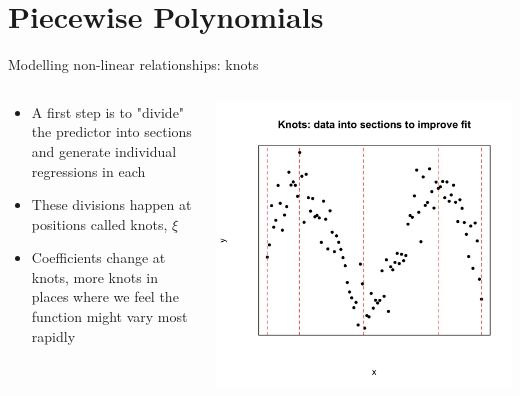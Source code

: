 \documentclass[english]{beamer}
\newcommand{\alertblue}[1]{{\color{blue}#1}}
\begin{document}
\section{Piecewise Polynomials}
\begin{frame}{Modelling non-linear relationships: knots}
    \begin{columns}
        \begin{column}{0.65\textwidth}
            \begin{itemize}
                \item A first step is to "divide" the predictor into sections and generate individual regressions in each  
                \item These divisions happen at positions called \alertblue{knots, \(\xi\)} 
                \item \alertblue{Coefficients} change at knots, more knots in places where we feel the \alertblue{function might vary most rapidly}
            \end{itemize}
        \end{column}
        \begin{column}{0.49\textwidth}
            \centering
            \includegraphics[width=\linewidth]{images/knots.jpeg} 
        \end{column}
    \end{columns}
\end{frame}
\end{document}

